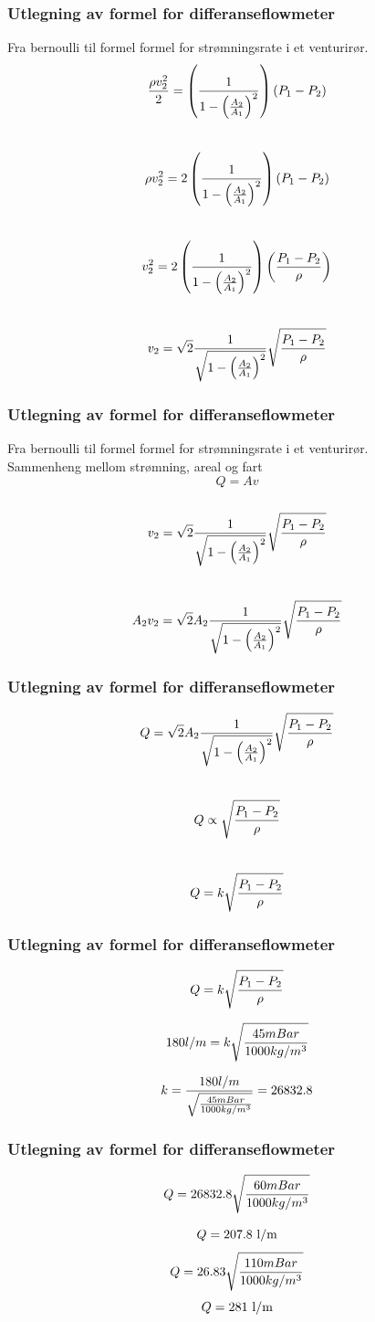 \documentclass[aspectratio=169,xcolor=dvipsnames]{beamer}
\begin{document}
\begin{frame}
	\frametitle{Utlegning av formel for differanseflowmeter}
	Fra bernoulli til formel formel for strømningsrate i et venturirør. 
%
%
$${\rho v_2^2 \over 2} = \left({1 \over {1 - \left({A_2 \over A_1}\right)^2}}\right) (P_1 - P_2)$$
\\
$$\rho v_2^2 = 2 \left({1 \over {1 - \left({A_2 \over A_1}\right)^2}}\right) (P_1 - P_2)$$
\\
$$v_2^2 = 2 \left({1 \over {1 - \left({A_2 \over A_1}\right)^2}}\right) \left({{P_1 - P_2} \over \rho}\right)$$
\\
$$v_2 = \sqrt{2} {1 \over \sqrt{1 - \left({A_2 \over A_1}\right)^2}} \sqrt{{P_1 - P_2} \over \rho}$$
%
%
%
\end{frame}

\begin{frame}
	\frametitle{Utlegning av formel for differanseflowmeter}
	Fra bernoulli til formel formel for strømningsrate i et venturirør. 
\\
	Sammenheng mellom strømning, areal og fart
	\\
$$Q = Av$$
\\
$$v_2 = \sqrt{2} {1 \over \sqrt{1 - \left({A_2 \over A_1}\right)^2}} \sqrt{{P_1 - P_2} \over \rho}$$
\\
$$A_2 v_2 = \sqrt{2} A_2 {1 \over \sqrt{1 - \left({A_2 \over A_1}\right)^2}} \sqrt{{P_1 - P_2} \over \rho}$$
\end{frame}

\begin{frame}
	\frametitle{Utlegning av formel for differanseflowmeter}
$$Q = \sqrt{2} A_2 {1 \over \sqrt{1 - \left({A_2 \over A_1}\right)^2}} \sqrt{{P_1 - P_2} \over \rho}$$
\\
$$Q \propto \sqrt{{P_1 - P_2} \over \rho}$$
\\
$$Q = k \sqrt{{P_1 - P_2} \over \rho}$$
%
\end{frame}

\begin{frame}
	\frametitle{Utlegning av formel for differanseflowmeter}

$$Q = k \sqrt{{P_1 - P_2} \over \rho}$$

$$180 l/m = k \sqrt{{45mBar} \over 1000kg/m^3}$$

$$k = {180l/m \over \sqrt{45mBar \over 1000kg/m^3}} = 26832.8$$

\end{frame}
\begin{frame}
	\frametitle{Utlegning av formel for differanseflowmeter}



$$Q = 26832.8 \sqrt{60mBar \over 1000kg/m^3}$$

$$Q = 207.8 \hbox{ l/m}$$
$$Q = 26.83 \sqrt{110mBar \over 1000kg/m^3}$$
%
$$Q = 281 \hbox{ l/m}$$
\end{frame}
\end{document}

